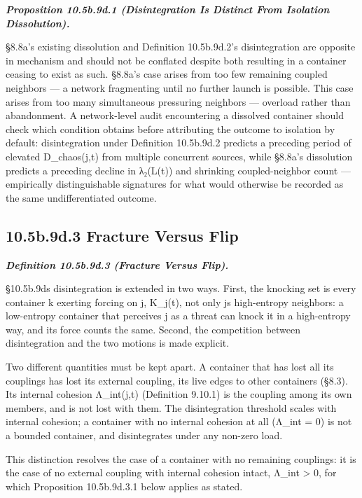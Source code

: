 \documentclass[
]{article}
\begin{document}
\emph{\textbf{Proposition 10.5b.9d.1 (Disintegration Is Distinct From
Isolation Dissolution).}}

§8.8a's existing dissolution and Definition 10.5b.9d.2's disintegration
are opposite in mechanism and should not be conflated despite both
resulting in a container ceasing to exist as such. §8.8a's case arises
from too few remaining coupled neighbors --- a network fragmenting until
no further launch is possible. This case arises from too many
simultaneous pressuring neighbors --- overload rather than abandonment.
A network-level audit encountering a dissolved container should check
which condition obtains before attributing the outcome to isolation by
default: disintegration under Definition 10.5b.9d.2 predicts a preceding
period of elevated D\_chaos(j,t) from multiple concurrent sources, while
§8.8a's dissolution predicts a preceding decline in λ₂(L(t)) and
shrinking coupled-neighbor count --- empirically distinguishable
signatures for what would otherwise be recorded as the same
undifferentiated outcome.

\hypertarget{b.9d.3-fracture-versus-flip}{%
\subsection{10.5b.9d.3 Fracture Versus
Flip}\label{b.9d.3-fracture-versus-flip}}

\emph{\textbf{Definition 10.5b.9d.3 (Fracture Versus Flip).}}

§10.5b.9d\textquotesingle s disintegration is extended in two ways.
First, the knocking set is every container k exerting forcing on j,
K\_j(t), not only j\textquotesingle s high-entropy neighbors: a
low-entropy container that perceives j as a threat can knock it in a
high-entropy way, and its force counts the same. Second, the competition
between disintegration and the two motions is made explicit.

Two different quantities must be kept apart. A container that has lost
all its couplings has lost its external coupling, its live edges to
other containers (§8.3). Its internal cohesion Λ\_int(j,t) (Definition
9.10.1) is the coupling among its own members, and is not lost with
them. The disintegration threshold scales with internal cohesion; a
container with no internal cohesion at all (Λ\_int = 0) is not a bounded
container, and disintegrates under any non-zero load.

This distinction resolves the case of a container with no remaining
couplings: it is the case of no external coupling with internal cohesion
intact, Λ\_int \textgreater{} 0, for which Proposition 10.5b.9d.3.1
below applies as stated.
\end{document}
